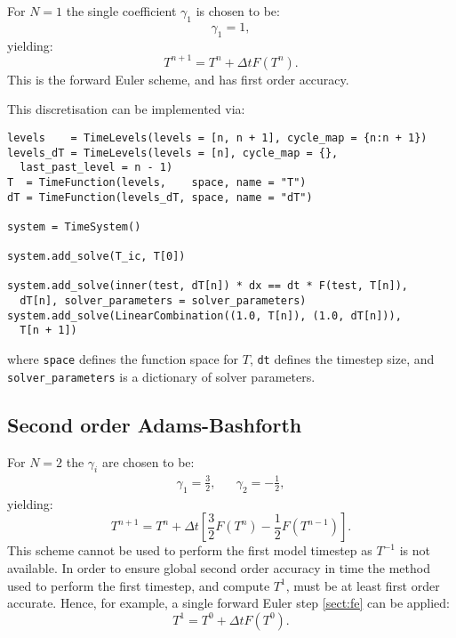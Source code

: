 \documentclass[a4paper]{book}
\begin{document}
For $N = 1$ the single coefficient $\gamma_1$ is chosen to be:
\begin{equation}
  \gamma_1 = 1,
\end{equation}
yielding:
\begin{equation}
  T^{n + 1} = T^n + \Delta t F(T^n).
\end{equation}
This is the forward Euler scheme, and has first order accuracy.

This discretisation can be implemented via:
\begin{lstlisting}
levels    = TimeLevels(levels = [n, n + 1], cycle_map = {n:n + 1})
levels_dT = TimeLevels(levels = [n], cycle_map = {},
  last_past_level = n - 1)
T  = TimeFunction(levels,    space, name = "T")
dT = TimeFunction(levels_dT, space, name = "dT")

system = TimeSystem()

system.add_solve(T_ic, T[0])

system.add_solve(inner(test, dT[n]) * dx == dt * F(test, T[n]),
  dT[n], solver_parameters = solver_parameters)
system.add_solve(LinearCombination((1.0, T[n]), (1.0, dT[n])),
  T[n + 1])
\end{lstlisting}
where \verb+space+ defines the function space for $T$, \verb+dt+ defines the
timestep size, and \verb+solver_parameters+ is a dictionary of solver
parameters.

\subsection{Second order Adams-Bashforth}\label{sect:ab2}

For $N = 2$ the $\gamma_i$ are chosen to be:
\begin{align}
  \gamma_1 = \frac{3}{2}, & & \gamma_2 = -\frac{1}{2},
\end{align}
yielding:
\begin{equation}
  T^{n + 1} = T^n + \Delta t \left[ \frac{3}{2} F(T^n) - \frac{1}{2} F(T^{n - 1}) \right].
\end{equation}
This scheme cannot be used to perform the first model timestep as $T^{-1}$ is
not available. In order to ensure global second order accuracy in time the
method used to perform the first timestep, and compute $T^1$, must be at least
first order accurate. Hence, for example, a single forward Euler step
\ref{sect:fe} can be applied:
\begin{equation}
  T^1 = T^0 + \Delta t F(T^0).
\end{equation}
\end{document}
